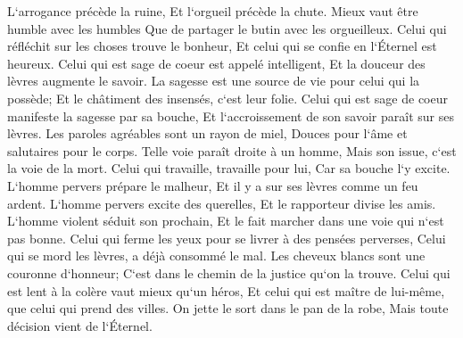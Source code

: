 \verse L`arrogance précède la ruine, Et l`orgueil précède la chute. 
\verse Mieux vaut être humble avec les humbles Que de partager le butin avec les orgueilleux. 
\verse Celui qui réfléchit sur les choses trouve le bonheur, Et celui qui se confie en l`Éternel est heureux. 
\verse Celui qui est sage de coeur est appelé intelligent, Et la douceur des lèvres augmente le savoir. 
\verse La sagesse est une source de vie pour celui qui la possède; Et le châtiment des insensés, c`est leur folie. 
\verse Celui qui est sage de coeur manifeste la sagesse par sa bouche, Et l`accroissement de son savoir paraît sur ses lèvres. 
\verse Les paroles agréables sont un rayon de miel, Douces pour l`âme et salutaires pour le corps. 
\verse Telle voie paraît droite à un homme, Mais son issue, c`est la voie de la mort. 
\verse Celui qui travaille, travaille pour lui, Car sa bouche l`y excite. 
\verse L`homme pervers prépare le malheur, Et il y a sur ses lèvres comme un feu ardent. 
\verse L`homme pervers excite des querelles, Et le rapporteur divise les amis. 
\verse L`homme violent séduit son prochain, Et le fait marcher dans une voie qui n`est pas bonne. 
\verse Celui qui ferme les yeux pour se livrer à des pensées perverses, Celui qui se mord les lèvres, a déjà consommé le mal. 
\verse Les cheveux blancs sont une couronne d`honneur; C`est dans le chemin de la justice qu`on la trouve. 
\verse Celui qui est lent à la colère vaut mieux qu`un héros, Et celui qui est maître de lui-même, que celui qui prend des villes. 
\verse On jette le sort dans le pan de la robe, Mais toute décision vient de l`Éternel. 

